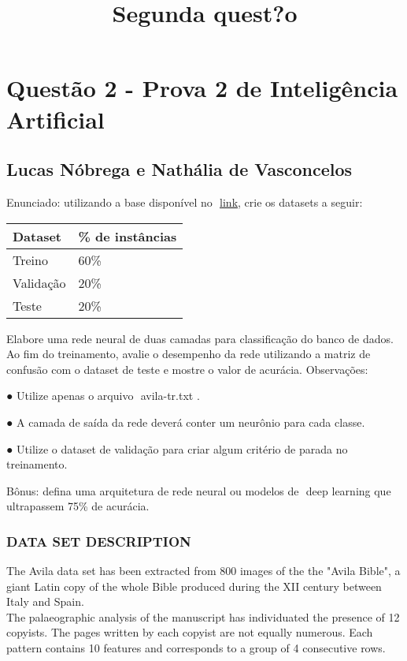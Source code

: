 \documentclass[11pt]{article}
\title{Segunda quest?o}
\begin{document}
    
    
    \maketitle
    
    

    
    \section{Questão 2 - Prova 2 de Inteligência
Artificial}\label{questuxe3o-2---prova-2-de-inteliguxeancia-artificial}

\subsection{Lucas Nóbrega e Nathália de
Vasconcelos}\label{lucas-nuxf3brega-e-nathuxe1lia-de-vasconcelos}

Enunciado: utilizando a base disponível no ​
\href{https://archive.ics.uci.edu/ml/datasets/Avila}{link}, crie os
datasets a seguir:

\begin{longtable}[]{@{}ll@{}}
\toprule
Dataset & \% de instâncias\tabularnewline
\midrule
\endhead
Treino & 60\%\tabularnewline
Validação & 20\%\tabularnewline
Teste & 20\%\tabularnewline
\bottomrule
\end{longtable}

Elabore uma rede neural de duas camadas para classificação do banco de
dados. Ao fim do treinamento, avalie o desempenho da rede utilizando a
matriz de confusão com o dataset de teste e mostre o valor de acurácia.
Observações:

● Utilize apenas o arquivo ​ avila-tr.txt​ .

● A camada de saída da rede deverá conter um neurônio para cada classe.

● Utilize o dataset de validação para criar algum critério de parada no
treinamento.

Bônus: defina uma arquitetura de rede neural ou modelos de ​ deep
learning que ultrapassem 75\% de acurácia.

    \subsubsection{DATA SET DESCRIPTION}\label{data-set-description}

The Avila data set has been extracted from 800 images of the the "Avila
Bible", a giant Latin copy of the whole Bible produced during the XII
century between Italy and Spain.\\
The palaeographic analysis of the manuscript has individuated the
presence of 12 copyists. The pages written by each copyist are not
equally numerous. Each pattern contains 10 features and corresponds to a
group of 4 consecutive rows.
\end{document}
